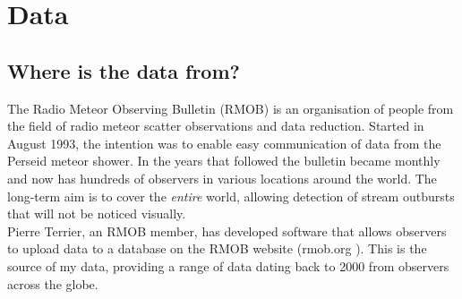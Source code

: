 \chapter{Data}
\label{chap:data}
\section{Where is the data from?}
The Radio Meteor Observing Bulletin (RMOB) \cite{rmob} is an organisation of people from the field of radio meteor scatter observations and data reduction. Started in August 1993, the intention was to enable easy communication of data from the Perseid meteor shower. In the years that followed the bulletin became monthly and now has hundreds of observers in various locations around the world. The long-term aim is to cover the {\it entire} world, allowing detection of stream outbursts that will not be noticed visually.\\
Pierre Terrier, an RMOB member, has developed software that allows observers to upload data to a database on the RMOB website (rmob.org \cite{rmob}). This is the source of my data, providing a range of data dating back to 2000 from observers across the globe.
